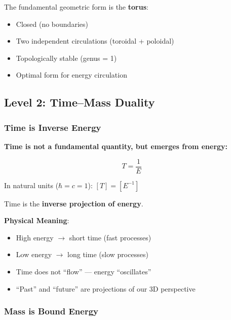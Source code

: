 	The fundamental geometric form is the \textbf{torus}:
	\begin{itemize}
		\item Closed (no boundaries)
		\item Two independent circulations (toroidal + poloidal)
		\item Topologically stable (genus = 1)
		\item Optimal form for energy circulation
	\end{itemize}
	
	\subsection{Level 2: Time–Mass Duality}
	
	\subsubsection{Time is Inverse Energy}
	
	\begin{keyresult}
		\textbf{Time is not a fundamental quantity, but emerges from energy:}
		
		\begin{equation}
			\boxed{T = \frac{1}{E}}
		\end{equation}
		
		In natural units ($\hbar = c = 1$): $[T] = [E^{-1}]$
		
		\vspace{0.3cm}
		
		Time is the \textbf{inverse projection of energy}.
	\end{keyresult}
	
	\textbf{Physical Meaning}:
	\begin{itemize}
		\item High energy $\to$ short time (fast processes)
		\item Low energy $\to$ long time (slow processes)
		\item Time does not \enquote{flow} — energy \enquote{oscillates}
		\item \enquote{Past} and \enquote{future} are projections of our 3D perspective
	\end{itemize}
	
	\subsubsection{Mass is Bound Energy}
	

